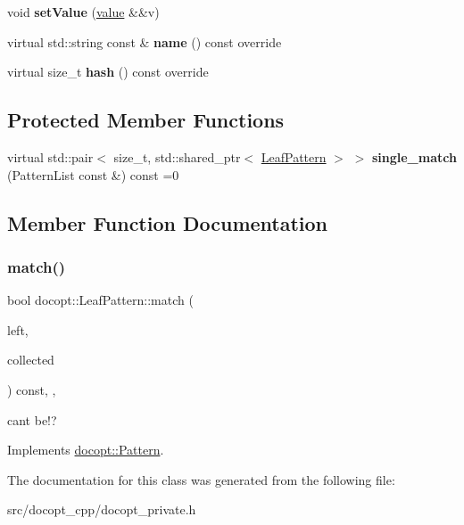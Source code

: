 \begin{DoxyCompactItemize}
\item 
\mbox{\label{classdocopt_1_1LeafPattern_a44655164a427a6f6e0d98f1f30a88bac}} 
void {\bfseries set\+Value} (\hyperlink{structdocopt_1_1value}{value} \&\&v)
\item 
\mbox{\label{classdocopt_1_1LeafPattern_a1f93d0ff7fb9ad327bfcddcfb8738c4e}} 
virtual std\+::string const  \& {\bfseries name} () const override
\item 
\mbox{\label{classdocopt_1_1LeafPattern_a14d89a711b87a8d5d84a081a602d97b9}} 
virtual size\+\_\+t {\bfseries hash} () const override
\end{DoxyCompactItemize}
\subsection*{Protected Member Functions}
\begin{DoxyCompactItemize}
\item 
\mbox{\label{classdocopt_1_1LeafPattern_ae41cbcdb3d0b326ebae660148f860d27}} 
virtual std\+::pair$<$ size\+\_\+t, std\+::shared\+\_\+ptr$<$ \hyperlink{classdocopt_1_1LeafPattern}{Leaf\+Pattern} $>$ $>$ {\bfseries single\+\_\+match} (Pattern\+List const \&) const =0
\end{DoxyCompactItemize}


\subsection{Member Function Documentation}
\mbox{\label{classdocopt_1_1LeafPattern_a634a7028ce2c71ebb89586088034b7e2}} 
\subsubsection{\texorpdfstring{match()}{match()}}
{\footnotesize\ttfamily bool docopt\+::\+Leaf\+Pattern\+::match (\begin{DoxyParamCaption}\item[{Pattern\+List \&}]{left,  }\item[{std\+::vector$<$ std\+::shared\+\_\+ptr$<$ \hyperlink{classdocopt_1_1LeafPattern}{Leaf\+Pattern} $>$$>$ \&}]{collected }\end{DoxyParamCaption}) const\hspace{0.3cm}{\ttfamily [inline]}, {\ttfamily [override]}, {\ttfamily [virtual]}}

cant be!? 

Implements \hyperlink{classdocopt_1_1Pattern}{docopt\+::\+Pattern}.



The documentation for this class was generated from the following file\+:\begin{DoxyCompactItemize}
\item 
src/docopt\+\_\+cpp/docopt\+\_\+private.\+h\end{DoxyCompactItemize}
